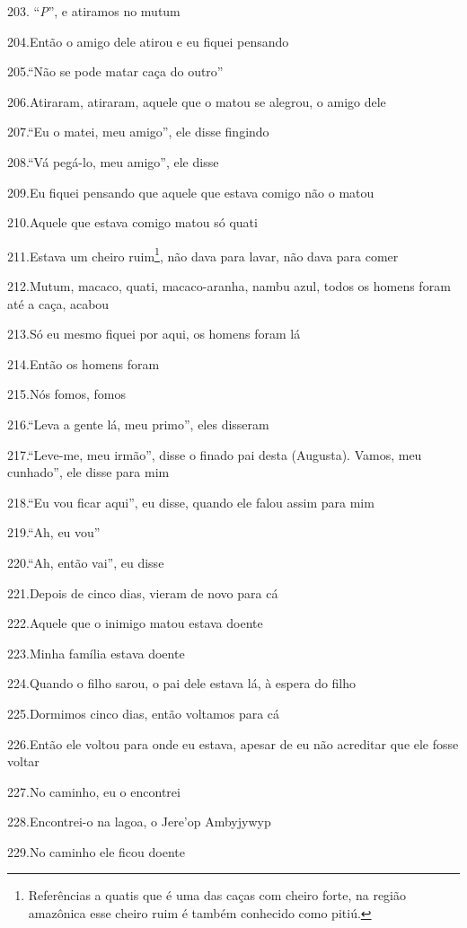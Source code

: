 203. ``\emph{P}'', e atiramos no mutum

204.Então o amigo dele atirou e eu fiquei pensando

205.``Não se pode matar caça do outro''

206.Atiraram, atiraram, aquele que o matou se alegrou, o amigo dele

207.``Eu o matei, meu amigo'', ele disse fingindo

208.``Vá pegá-lo, meu amigo'', ele disse

209.Eu fiquei pensando que aquele que estava comigo não o matou

210.Aquele que estava comigo matou só quati

211.Estava um cheiro ruim\footnote{Referências a quatis que é uma das
  caças com cheiro forte, na região amazônica esse cheiro ruim é também
  conhecido como pitiú.}, não dava para lavar, não dava para comer

212.Mutum, macaco, quati, macaco-aranha, nambu azul, todos os homens
foram até a caça, acabou

213.Só eu mesmo fiquei por aqui, os homens foram lá

214.Então os homens foram

215.Nós fomos, fomos

216.``Leva a gente lá, meu primo'', eles disseram

217.``Leve-me, meu irmão'', disse o finado pai desta (Augusta). Vamos,
meu cunhado'', ele disse para mim

218.``Eu vou ficar aqui'', eu disse, quando ele falou assim para mim

219.``Ah, eu vou''

220.``Ah, então vai'', eu disse

221.Depois de cinco dias, vieram de novo para cá

222.Aquele que o inimigo matou estava doente

223.Minha família estava doente

224.Quando o filho sarou, o pai dele estava lá, à espera do filho

225.Dormimos cinco dias, então voltamos para cá

226.Então ele voltou para onde eu estava, apesar de eu não acreditar que
ele fosse voltar

227.No caminho, eu o encontrei

228.Encontrei-o na lagoa, o Jere'op Ambyjywyp

229.No caminho ele ficou doente

